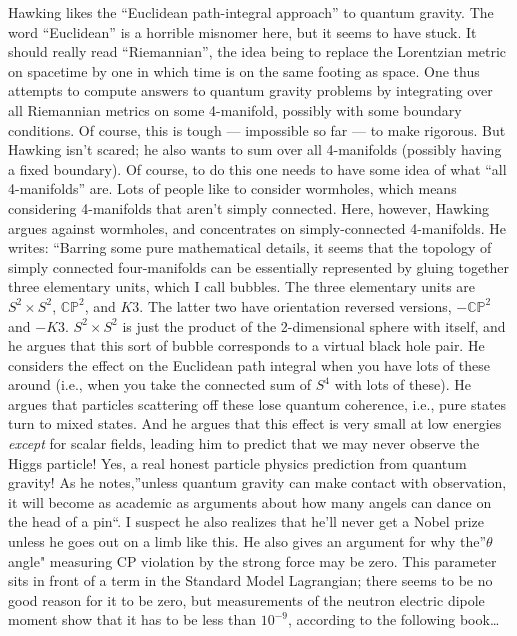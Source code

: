 \documentclass{article}
\begin{document}
Hawking likes the ``Euclidean path-integral approach'' to quantum
gravity. The word ``Euclidean'' is a horrible misnomer here, but it
seems to have stuck. It should really read ``Riemannian'', the idea
being to replace the Lorentzian metric on spacetime by one in which time
is on the same footing as space. One thus attempts to compute answers to
quantum gravity problems by integrating over all Riemannian metrics on
some 4-manifold, possibly with some boundary conditions. Of course, this
is tough --- impossible so far --- to make rigorous. But Hawking isn't
scared; he also wants to sum over all 4-manifolds (possibly having a
fixed boundary). Of course, to do this one needs to have some idea of
what ``all 4-manifolds'' are. Lots of people like to consider wormholes,
which means considering 4-manifolds that aren't simply connected. Here,
however, Hawking argues against wormholes, and concentrates on
simply-connected 4-manifolds. He writes: ``Barring some pure
mathematical details, it seems that the topology of simply connected
four-manifolds can be essentially represented by gluing together three
elementary units, which I call bubbles. The three elementary units are
\(S^2 \times S^2\), \(\mathbb{CP}^2\), and \(K3\). The latter two have
orientation reversed versions, \(-\mathbb{CP}^2\) and \(-K3\).
\(S^2 \times S^2\) is just the product of the 2-dimensional sphere with
itself, and he argues that this sort of bubble corresponds to a virtual
black hole pair. He considers the effect on the Euclidean path integral
when you have lots of these around (i.e., when you take the connected
sum of \(S^4\) with lots of these). He argues that particles scattering
off these lose quantum coherence, i.e., pure states turn to mixed
states. And he argues that this effect is very small at low energies
\emph{except} for scalar fields, leading him to predict that we may
never observe the Higgs particle! Yes, a real honest particle physics
prediction from quantum gravity! As he notes,''unless quantum gravity
can make contact with observation, it will become as academic as
arguments about how many angels can dance on the head of a pin``. I
suspect he also realizes that he'll never get a Nobel prize unless he
goes out on a limb like this. He also gives an argument for why
the''\(\theta\) angle" measuring CP violation by the strong force may be
zero. This parameter sits in front of a term in the Standard Model
Lagrangian; there seems to be no good reason for it to be zero, but
measurements of the neutron electric dipole moment show that it has to
be less than \(10^{-9}\), according to the following book\ldots{}
\end{document}
